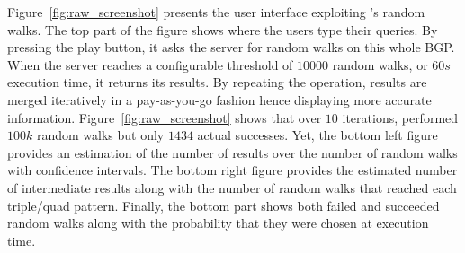  
Figure~\ref{fig:raw_screenshot} presents the user interface exploiting
\NAME's random walks. The top part of the figure shows where the users
type their queries. By pressing the play button, it asks the server
for random walks on this whole BGP. When the server reaches a
configurable threshold of $10 000$ random walks, or $60s$ execution
time, it returns its results. By repeating the operation, results are
merged iteratively in a pay-as-you-go fashion hence displaying more
accurate information. Figure~\ref{fig:raw_screenshot} shows that over
$10$ iterations, \NAME performed $100k$ random walks but only $1434$
actual successes.  Yet, the bottom left figure provides an estimation
of the number of results over the number of random walks with
confidence intervals. The bottom right figure provides the estimated
number of intermediate results along with the number of random walks
that reached each triple/quad pattern.  Finally, the bottom part shows
both failed and succeeded random walks along with the probability that
they were chosen at execution time.





